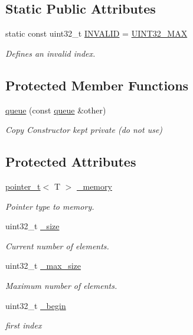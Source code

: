 \subsection*{Static Public Attributes}
\begin{DoxyCompactItemize}
\item 
static const uint32\+\_\+t \hyperlink{classcrap_1_1queue_a0515fc038b1eb4d6af4fd1612de127c5}{I\+N\+V\+A\+L\+I\+D} = \hyperlink{crap__types_8h_ab5eb23180f7cc12b7d6c04a8ec067fdd}{U\+I\+N\+T32\+\_\+\+M\+A\+X}
\begin{DoxyCompactList}\small\item\em Defines an invalid index. \end{DoxyCompactList}\end{DoxyCompactItemize}
\subsection*{Protected Member Functions}
\begin{DoxyCompactItemize}
\item 
\hyperlink{classcrap_1_1queue_addabb985272064c0d3f2e028c830070a}{queue} (const \hyperlink{classcrap_1_1queue}{queue} \&other)
\begin{DoxyCompactList}\small\item\em Copy Constructor kept private (do not use) \end{DoxyCompactList}\end{DoxyCompactItemize}
\subsection*{Protected Attributes}
\begin{DoxyCompactItemize}
\item 
\hyperlink{structcrap_1_1pointer__t}{pointer\+\_\+t}$<$ T $>$ \hyperlink{classcrap_1_1queue_aaa7768109ef5518469358b6963282c8d}{\+\_\+memory}
\begin{DoxyCompactList}\small\item\em Pointer type to memory. \end{DoxyCompactList}\item 
uint32\+\_\+t \hyperlink{classcrap_1_1queue_a6025cd210773605e1b78d9136c020409}{\+\_\+size}
\begin{DoxyCompactList}\small\item\em Current number of elements. \end{DoxyCompactList}\item 
uint32\+\_\+t \hyperlink{classcrap_1_1queue_a01314cde8e1d28f2f8d5d347f3ce94a8}{\+\_\+max\+\_\+size}
\begin{DoxyCompactList}\small\item\em Maximum number of elements. \end{DoxyCompactList}\item 
uint32\+\_\+t \hyperlink{classcrap_1_1queue_a754dd42464cea488ad629109dfd8933f}{\+\_\+begin}
\begin{DoxyCompactList}\small\item\em first index \end{DoxyCompactList}\end{DoxyCompactItemize}


